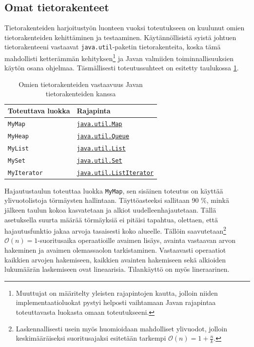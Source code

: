 \documentclass[10pt,a4paper]{article}
\begin{document}
\subsection{Omat tietorakenteet}
\label{datastructures}

Tietorakenteiden harjoitustyön luonteen vuoksi toteutukseen on kuulunut omien tietorakenteiden kehittäminen ja testaaminen. Käytännöllisistä syistä johtuen tietorakenteeni vastaavat \texttt{java.util}-paketin tietorakenteita, koska tämä mahdollisti ketterämmän kehityksen\footnote{Muuttujat on määritelty yleisten rajapintojen kautta, jolloin niiden implementaatioluokat pystyi helposti vaihtamaan Javan rajapintaa toteuttavasta luokasta omaan toteutukseeni.} ja Javan valmiiden toiminnallisuuksien käytön osana ohjelmaa. Täsmällisesti toteutussuhteet on esitetty taulukossa \ref{omat_tietorakenteet}.

\begin{table}

\begin{tabular}{l|l}
Toteuttava luokka & Rajapinta \\ 
\hline 
\texttt{MyMap} &  \href{http://docs.oracle.com/javase/6/docs/api/java/util/Map.html}{\texttt{java.util.Map}} \\
\texttt{MyHeap} & \href{http://docs.oracle.com/javase/6/docs/api/java/util/Queue.html}{\texttt{java.util.Queue}} \\ 
\texttt{MyList} & \href{http://docs.oracle.com/javase/6/docs/api/java/util/List.html}{\texttt{java.util.List}} \\ 
\texttt{MySet} & \href{http://docs.oracle.com/javase/6/docs/api/java/util/Set.html}{\texttt{java.util.Set}} \\ 
\texttt{MyIterator} & \href{http://docs.oracle.com/javase/6/docs/api/java/util/ListIterator.html}{\texttt{java.util.ListIterator}} \\ 
\end{tabular}
\caption{Omien tietorakenteiden vastaavuus Javan tietorakenteiden kanssa}
\label{omat_tietorakenteet}
\end{table}

Hajautustaulun toteuttaa luokka \texttt{MyMap}, sen sisäinen toteutus on käyttää ylivuotolistoja törmäysten hallintaan. Täyttöasteeksi sallitaan 90 \%, minkä jälkeen taulun kokoa kasvatetaan ja alkiot uudelleenhajautetaan. Tällä asetuksella suurta määrää törmäyksiä ei pitäisi tapahtua, olettaen, että hajautusfunktio jakaa arvoja tasaisesti koko alueelle. Tällöin saavutetaan\footnote{Laskennallisesti usein myös huomioidaan mahdolliset ylivuodot, jolloin keskimääräiseksi suoritusajaksi esitetään tarkempi $\mathcal{O}(n) = 1 + \frac{n}{k}$.} $\mathcal{O}(n) = 1$-suoritusaika operaatioille avaimen lisäys, avainta vastaavan arvon hakeminen ja avaimen olemassaolon tarkistaminen. Vastaavasti operaatiot kaikkien arvojen hakemiseen, kaikkien avainten hakemiseen sekä alkioiden lukumäärän laskemiseen ovat lineaarisia. Tilankäyttö on myös lineraarinen.
\end{document}
